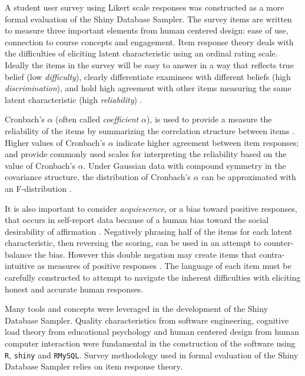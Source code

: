 A student user survey using Likert scale responses was constructed as a more formal evaluation of the Shiny Database Sampler. The survey items are written to measure three important elements from human centered design: ease of use, connection to course concepts and engagement. Item response theory deals with the difficulties of eliciting latent characteristic using an ordinal rating scale. Ideally the items in the survey will be easy to answer in a way that reflects true belief (low \textit{difficulty}), clearly differentiate examinees with different beliefs (high \textit{discrimination}), and hold high agreement with other items measuring the same latent characteristic (high \textit{reliability}) \citep{demars2010item}.

Cronbach's $\alpha$ (often called \textit{coefficient} $\alpha$), is used to provide a measure the reliability of the items by summarizing the correlation structure between items \citep{cronbach:51}. Higher values of Cronbach's $\alpha$ indicate higher agreement between item responses; \citet{GeorgeMallery2003} and \citet{Nunnally1978} provide commonly used scales for interpreting the reliability based on the value of Cronbach's $\alpha$.  Under Gaussian data with compound symmetry in the covariance structure, the distribution of Cronbach's $\alpha$ can be approximated with an F-distribution \citep{KistnerMuller2004}. 

It is also important to consider \textit{acquiescence}, or a bias toward positive responses, that occurs in self-report data because of a human bias toward the social desirability of affirmation \citep{Furnham1986}. Negatively phrasing half of the items for each latent characteristic, then reversing the scoring, can be used in an attempt to counter-balance the bias. However this double negation may create items that contra-intuitive as measures of positive responses \citep{Friborg2006}. The language of each item must be carefully constructed to attempt to navigate the inherent difficulties with eliciting honest and accurate human responses.

Many tools and concepts were leveraged in the development of the Shiny Database Sampler. Quality characteristics from software engineering, cognitive load theory from educational psychology and human centered design from human computer interaction were fundamental in the construction of the software using \texttt{R}, \texttt{shiny} and \texttt{RMySQL}. Survey methodology used in formal evaluation of the Shiny Database Sampler relies on item response theory. 

